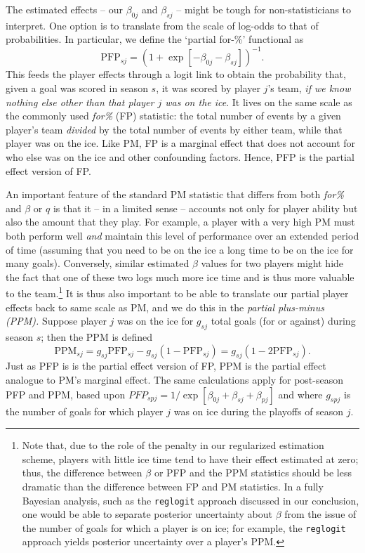 The estimated effects -- our $\beta_{0j}$ and $\beta_{sj}$ -- might be tough for
non-statisticians to interpret. One option is to translate from the scale of
log-odds to that of probabilities. In particular, we define the `partial for-\%' functional as
\begin{equation}\label{eq:pfp}
\text{PFP}_{sj} = \left(1 + \exp[-\beta_{0j} - \beta_{sj}]\right)^{-1}.
\end{equation}
This feeds the player effects through a logit link  to obtain  the
probability that, given a goal was scored in season $s$, it was scored by
player $j$'s team, {\it if we know nothing else other than that player $j$ was
on the ice}. It lives on the same scale as the commonly used \textit{for\%}
(FP) statistic: the total number of events by a given player's team
\textit{divided} by the total number of events by either team, while that
player was on the ice.   Like PM, FP is a marginal effect that does not
account for who else was on the ice and other confounding factors.  Hence, PFP
is the partial effect version of FP.

An important feature of the standard PM statistic that differs from both
\textit{for\%} and $\beta$ or $q$ is that it -- in a limited sense -- accounts
not only for player ability but also the amount that they play.  For example,
a player with a very high PM must both perform well \textit{and} maintain this
level of performance over an extended period of time (assuming that you need
to be on the ice a long time to be on the ice for many goals).  Conversely,
similar estimated $\beta$ values for two players might hide the fact that one
of these two logs much more ice time and is thus more valuable to the
team.\footnote{Note that, due to the role of the penalty in our regularized
estimation scheme,  players with little ice time tend to have their effect
estimated at zero; thus, the difference between $\beta$ or PFP and the PPM
statistics should be less dramatic than the difference between FP and PM
statistics. In a fully Bayesian analysis, such as the {\tt reglogit} approach
discussed in our conclusion, one would be able to separate posterior
uncertainty about $\beta$ from the issue of the number of goals for which a
player is on ice; for example, the {\tt reglogit} approach yields posterior
uncertainty over a player's PPM.}  It is thus also important to be able to
translate our partial player effects back to same scale as PM, and we do this
in the {\em partial plus-minus (PPM).} Suppose player $j$ was on the ice for
$g_{sj}$ total goals (for or against) during season $s$; then the PPM is
defined \begin{equation}\label{eq:ppm}  \text{PPM}_{sj} =
g_{sj}\text{PFP}_{sj} - g_{sj}(1-\text{PFP}_{sj}) = g_{sj}(1 -
2\text{PFP}_{sj}).  \end{equation}   Just as PFP is is the partial effect
version of FP, PPM is the partial effect analogue to PM's marginal effect.
The same calculations apply for  post-season PFP and PPM, based upon
$PFP_{spj} = 1/\exp[\beta_{0j} + \beta_{sj}+ \beta_{pj}]$ and where $g_{spj}$
is the number of goals for which player $j$ was on ice during the playoffs of
season $j$.

